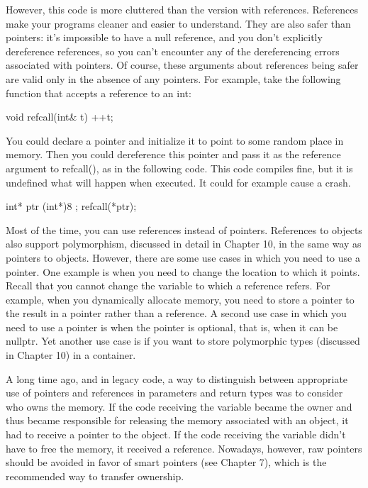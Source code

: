 However, this code is more cluttered than the version with references. References make your programs cleaner and easier to understand. They are also safer than pointers: it’s impossible to have a null reference, and you don’t explicitly dereference references, so you can’t encounter any of the dereferencing errors associated with pointers. Of course, these arguments about references being safer are valid only in the absence of any pointers. For example, take the following function that accepts a reference to an int:

\begin{cpp}
void refcall(int& t) { ++t; }
\end{cpp}

You could declare a pointer and initialize it to point to some random place in memory. Then you could dereference this pointer and pass it as the reference argument to refcall(), as in the following code. This code compiles fine, but it is undefined what will happen when executed. It could for example cause a crash.

\begin{cpp}
int* ptr { (int*)8 };
refcall(*ptr);
\end{cpp}

Most of the time, you can use references instead of pointers. References to objects also support polymorphism, discussed in detail in Chapter 10, in the same way as pointers to objects. However, there are some use cases in which you need to use a pointer. One example is when you need to change the location to which it points. Recall that you cannot change the variable to which a reference refers. For example, when you dynamically allocate memory, you need to store a pointer to the result in a pointer rather than a reference. A second use case in which you need to use a pointer is when the pointer is optional, that is, when it can be nullptr. Yet another use case is if you want to store polymorphic types (discussed in Chapter 10) in a container.

A long time ago, and in legacy code, a way to distinguish between appropriate use of pointers and references in parameters and return types was to consider who owns the memory. If the code receiving the variable became the owner and thus became responsible for releasing the memory associated with an object, it had to receive a pointer to the object. If the code receiving the variable didn’t have to free the memory, it received a reference. Nowadays, however, raw pointers should be avoided in favor of smart pointers (see Chapter 7), which is the recommended way to transfer ownership.

